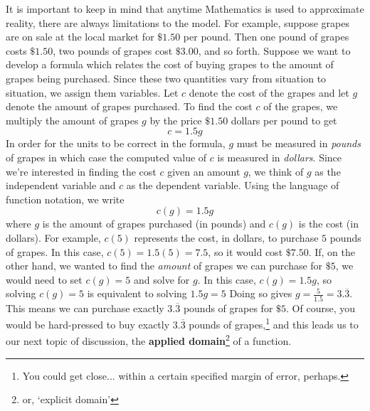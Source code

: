 It is important to keep in mind that anytime Mathematics is used to approximate reality, there are always limitations to the model.  For example, suppose grapes are on sale at the local market for $\$1.50$ per pound. Then one pound of grapes costs $\$1.50$, two pounds of grapes cost $\$3.00$, and so forth.  Suppose we want to develop a formula which relates the cost of buying grapes to the amount of grapes being purchased.  Since these two quantities vary from situation to situation, we assign them variables.  Let $c$ denote the cost of the grapes and let $g$ denote the amount of grapes purchased. To find the cost $c$ of the grapes, we multiply the amount of grapes $g$ by the price $\$1.50$ dollars per pound to get \[c = 1.5 g\]  In order for the units to be correct in the formula, $g$ must be measured in \textit{pounds} of grapes in which case the computed value of $c$ is measured in \textit{dollars}.  Since we're interested in finding the cost $c$ given an amount $g$, we think of $g$ as the independent variable and $c$ as the dependent variable.  Using the language of function notation, we write \[c(g) = 1.5 g\] where $g$ is the amount of grapes purchased (in pounds) and $c(g)$ is the cost (in dollars).  For example, $c(5)$ represents the cost, in dollars, to purchase $5$ pounds of grapes. In this case, $c(5) = 1.5(5) = 7.5$, so it would cost $\$ 7.50$. If, on the other hand, we wanted to find the \textit{amount} of grapes we can purchase for $\$5$, we would need to set $c(g) = 5$ and solve for $g$.  In this case, $c(g)=1.5g$, so solving  $c(g) = 5$ is equivalent to solving $1.5g = 5$  Doing so gives $g = \frac{5}{1.5} = 3.\overline{3}$. This means we can purchase exactly $3.\overline{3}$ pounds of grapes for $\$5$.  Of course, you would be hard-pressed to buy exactly $3.\overline{3}$ pounds of grapes,\footnote{You could get close...  within a certain specified margin of error, perhaps.} and this leads us to our next topic of discussion, the \textbf{applied domain}\footnote{or, `explicit domain'} of a function.

\medskip

